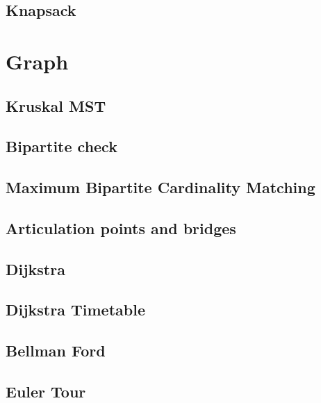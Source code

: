 \documentclass[a4paper,landscape,8pt]{article}
\begin{document}
\begin{multicols}{2}
\subsection{Knapsack}



\section{Graph}

\subsection{Kruskal MST}


\subsection{Bipartite check}


\subsection{Maximum Bipartite Cardinality Matching}


\subsection{Articulation points and bridges}


\subsection{Dijkstra}


\subsection{Dijkstra Timetable}


\subsection{Bellman Ford}


\subsection{Euler Tour}



\end{multicols}
\end{document}
